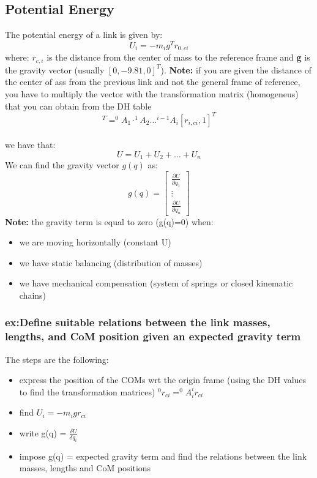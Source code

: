 \documentclass[a4paper,12pt]{article}
\begin{document}
\subsection{Potential Energy} \label{sec:Potential Energy}
The potential energy of a link is given by:
\begin{equation}
    U_i = -m_i g^T r_{0,ci}
\end{equation}
where:
$r_{c,i}$ is the distance from the center of mass to the reference frame and \textbf{g} is 
the gravity vector (usually $[0,-9.81,0]^T$).\newline
\textbf{Note:} if you are given the distance of the center of ass from the 
previous link and not the general frame of reference, you have to multiply the 
vector with the transformation matrix (homogeneus) that you can obtain from the DH table
\begin{equation}
    [r_{0,ci}, 1]^T=^0A_1 \cdot ^1A_2 \dots ^{i-1}A_i [r_{i,ci}, 1]^T
\end{equation}\\
we have that: \begin{equation}
    U= U_1+U_2+ \dots +U_n
\end{equation}
We can find the gravity vector $g(q)$ as:
\begin{equation}
    g(q) = \begin{bmatrix}
        \frac{\partial U}{\partial q_1} \\
        \vdots \\
        \frac{\partial U}{\partial q_n}
    \end{bmatrix}
\end{equation}
\textbf{Note:} the gravity term is equal to zero (g(q)=0) when:
\begin{itemize}
    \item we are moving horizontally (constant U)
    \item we have static balancing (distribution of masses)
    \item we have mechanical compensation (system of springs or closed kinematic chains)
\end{itemize}
    \subsubsection{ex:Define suitable relations between the link masses, lengths, and CoM position given an expected gravity term}
The steps are the following:
\begin{itemize}
    \item express the position of the COMs wrt the origin frame (using the DH values
    to find the transformation matrices) $^0r_{ci}=^0A_i ^ir_{ci}$
    \item find $U_i = -m_i g r_{ci}$
    \item write g(q) = $\frac{\delta U}{\delta q_i}$
    \item impose g(q) = expected gravity term and find the 
    relations between the link masses, lengths and CoM positions
\end{itemize}
\end{document}
